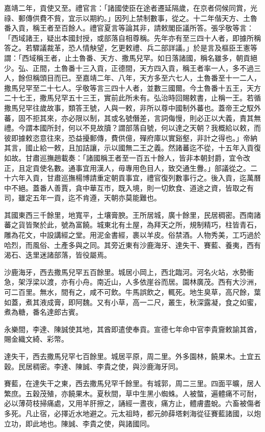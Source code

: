 \begin{pinyinscope}
嘉靖二年，貢使又至。禮官言：「諸國使臣在途者遷延隔歲，在京者伺候同賞，光祿、郵傳供費不貲，宜示以期約。」因列上禁制數事，從之。十二年偕天方、土魯番入貢，稱王者至百餘人。禮官夏言等論其非，請敕閣臣議所答。張孚敬等言：「西域諸王，疑出本國封授，或部落自相尊稱。先年亦有至三四十人者，即據所稱答之。若驟議裁革，恐人情觖望，乞更敕禮、兵二部詳議。」於是言及樞臣王憲等謂：「西域稱王者，止土魯番、天方、撒馬兒罕。如日落諸國，稱名雖多，朝貢絕少。弘、正間，土魯番十三入貢，正德間，天方四入貢，稱王者率一人，多不過三人，餘但稱頭目而已。至嘉靖二年、八年，天方多至六七人，土魯番至十一二人，撒馬兒罕至二十七人。孚敬等言三四十人者，並數三國爾。今土魯番十五王，天方二十七王，撒馬兒罕五十三王，實前此所未有。弘治時回賜敕書，止稱一王。若循撒馬兒罕往歲故事，類答王號，人與一敕，非所以尊中國制外蕃也。蓋帝王之馭外蕃，固不拒其來，亦必限以制，其或名號僭差，言詞侮慢，則必正以大義，責其無禮。今謂本國所封，何以不見故牘？謂部落自號，何以達之天朝？我概給以敕，而彼即據敕恣意往來，恐益擾郵傳，費供億，殫府庫以實谿壑，非計之得也。」帝納其言，國止給一敕，且加詰讓，示以國無二王之義。然諸蕃迄不從，十五年入貢復如故。甘肅巡撫趙載奏：「諸國稱王者至一百五十餘人，皆非本朝封爵，宜令改正，且定貢使名數。通事宜用漢人，毋專用色目人，致交通生釁。」部議從之。二十六年入貢，甘肅巡撫楊博請重定朝貢事宜，禮官復列數事行之。後入貢，迄萬曆中不絕。蓋番人善賈，貪中華互市，既入境，則一切飲食、道途之資，皆取之有司，雖定五年一貢，迄不肯遵，天朝亦莫能難也。

其國東西三千餘里，地寬平，土壤膏腴。王所居城，廣十餘里，民居稠密。西南諸蕃之貨皆聚於此，號為富饒。城東北有土屋，為拜天之所，規制精巧，柱皆青石，雕為花文，中設講經之堂。用泥金書經，裹以羊皮。俗禁酒。人物秀美，工巧過於哈烈，而風俗、土產多與之同。其旁近東有沙鹿海牙、達失干、賽藍、養夷，西有渴石、迭里迷諸部落，皆役屬焉。

沙鹿海牙，西去撒馬兒罕五百餘里。城居小岡上，西北臨河。河名火站，水勢衝急，架浮梁以渡，亦有小舟。南近山，人多依崖谷而居。園林廣茂。西有大沙洲，可二百里。無水，間有之，咸不可飲。牛馬誤飲之，輒死。地生臭草，高尺餘，葉如蓋，煮其液成膏，即阿魏。又有小草，高一二尺，叢生，秋深露凝，食之如蜜，煮為糖，番名達郎古賓。

永樂間，李達、陳誠使其地，其酋即遣使奉貢。宣德七年命中官李貴齎敕諭其酋，賜金織文綺、彩幣。

達失干，西去撒馬兒罕七百餘里。城居平原，周二里。外多園林，饒果木。土宜五穀。民居稠密。李達、陳誠、李貴之使，與沙鹿海牙同。

賽藍，在達失干之東，西去撒馬兒罕千餘里。有城郭，周二三里。四面平曠，居人繁庶。五穀茂殖，亦饒果木。夏秋間，草中生黑小蜘蛛。人被螫，遍體痛不可耐，必以薄荷枝掃痛處，又用羊肝擦之，誦經一晝夜，痛方止，體膚盡蛻。六畜被傷者多死。凡止宿，必擇近水地避之。元太祖時，都元帥薛塔剌海從征賽藍諸國，以炮立功，即此地也。陳誠、李貴之使，與諸國同。


\end{pinyinscope}
